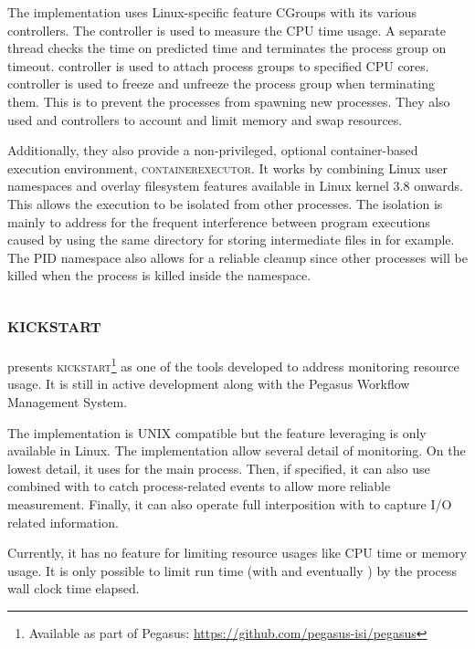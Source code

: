 The implementation uses Linux-specific feature CGroups with its various controllers.
The  controller is used to measure the CPU time usage.
A separate thread checks the time on predicted time and terminates the process group on timeout.
 controller is used to attach process groups to specified CPU cores.
 controller is used to freeze and unfreeze the process group when terminating them.
This is to prevent the processes from spawning new processes.
They also used  and  controllers to account and limit memory and swap resources.

Additionally, they also provide a non-privileged, optional container-based execution environment, \textsc{containerexecutor}.
It works by combining Linux user namespaces and overlay filesystem features available in Linux kernel 3.8 onwards.
This allows the execution to be isolated from other processes.
The isolation is mainly to address for the frequent interference between program executions caused by using the same directory for storing intermediate files in  for example.
The PID namespace also allows for a reliable cleanup since other processes will be killed when the  process is killed inside the namespace.


\subsection{\textsc{kickstart}}

\citet{juvePracticalResourceMonitoring2015} presents \textsc{kickstart}\footnote{Available as part of Pegasus: \href{https://github.com/pegasus-isi/pegasus}{https://github.com/pegasus-isi/pegasus}} as one of the tools developed to address monitoring resource usage.
It is still in active development along with the Pegasus Workflow Management System.

The implementation is UNIX compatible but the feature leveraging  is only available in Linux.
The implementation allow several detail of monitoring.
On the lowest detail, it uses  for the main process.
Then, if specified, it can also use  combined with  to catch process-related events to allow more reliable measurement.
Finally, it can also operate full interposition with  to capture I/O related information.

Currently, it has no feature for limiting resource usages like CPU time or memory usage.
It is only possible to limit run time (with  and eventually ) by the process wall clock time elapsed.


